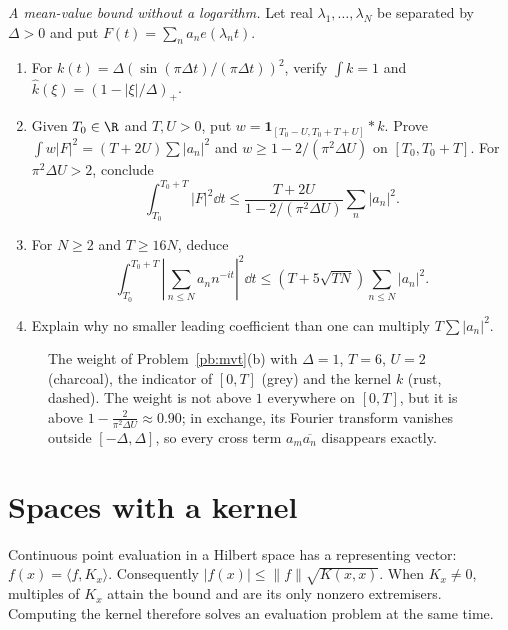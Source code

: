 \begin{exercise}[$\star\star\star$]\label{pb:mvt}
\emph{A mean-value bound without a logarithm.} Let real $\lambda_1,\ldots,\lambda_N$ be separated by $\Delta>0$ and put $F(t)=\sum_na_ne(\lambda_nt)$.
\begin{enumerate}[label=(\alph*)]
\item For $k(t)=\Delta(\sin(\pi\Delta t)/(\pi\Delta t))^2$, verify $\int k=1$ and $\hat k(\xi)=(1-|\xi|/\Delta)_+$.
\item Given $T_0\in\R$ and $T,U>0$, put $w=\mathbf1_{[T_0-U,T_0+T+U]}*k$. Prove $\int w|F|^2=(T+2U)\sum|a_n|^2$ and $w\ge1-2/(\pi^2\Delta U)$ on $[T_0,T_0+T]$. For $\pi^2\Delta U>2$, conclude
\[\int_{T_0}^{T_0+T}|F|^2\dd t\le\frac{T+2U}{1-2/(\pi^2\Delta U)}\sum_n|a_n|^2.\]
\item For $N\ge2$ and $T\ge16N$, deduce
\[\int_{T_0}^{T_0+T}\left|\sum_{n\le N}a_nn^{-it}\right|^2\dd t\le(T+5\sqrt{TN})\sum_{n\le N}|a_n|^2.\]
\item Explain why no smaller leading coefficient than one can multiply $T\sum|a_n|^2$.
\end{enumerate}
\end{exercise}
\begin{figure}[ht]
\centering
{}
\caption{The weight of Problem~\ref{pb:mvt}(b) with $\Delta=1$, $T=6$, $U=2$ (charcoal), the indicator of $[0,T]$ (grey) and the kernel $k$ (rust, dashed). The
weight is not above $1$ everywhere on $[0,T]$, but it is above $1-\frac2{\pi^2\Delta U}\approx0.90$; in exchange, its Fourier transform vanishes outside
$[-\Delta,\Delta]$, so every cross term $a_m\overline{a_n}$ disappears exactly.}\label{fig:majorant}
\end{figure}

\section{Spaces with a kernel}

Continuous point evaluation in a Hilbert space has a representing vector: $f(x)=\langle f,K_x\rangle$. Consequently $|f(x)|\le\|f\|\sqrt{K(x,x)}$. When $K_x\ne0$, multiples of $K_x$ attain the bound and are its only nonzero extremisers. Computing the kernel therefore solves an evaluation problem at the same time.

